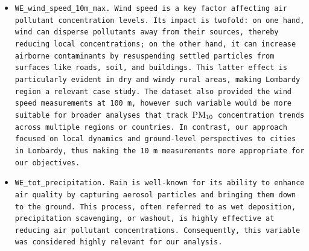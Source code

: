 \documentclass[12pt,	%
	a4paper,		%
	twoside,		%
	openright,		%
	titlepage,%
	]{book}
\theoremstyle{definition}
\begin{document}
\begin{itemize}
    \item \tt{WE\_wind\_speed\_10m\_max}. Wind speed is a key factor affecting air pollutant concentration levels. Its impact is twofold: on one hand, wind can disperse pollutants away from their sources, thereby reducing local concentrations; on the other hand, it can increase airborne contaminants by resuspending settled particles from surfaces like roads, soil, and buildings. This latter effect is particularly evident in dry and windy rural areas, making Lombardy region a relevant case study. The dataset also provided the wind speed measurements at \SI{100}{\metre}, however such variable would be more suitable for broader analyses that track $\text{PM}_{10}$ concentration trends across multiple regions or countries. In contrast, our approach focused on local dynamics and ground-level perspectives to cities in Lombardy, thus making the \SI{10}{\metre} measurements more appropriate for our objectives.

    \item \tt{WE\_tot\_precipitation}. Rain is well-known for its ability to enhance air quality by capturing aerosol particles and bringing them down to the ground. This process, often referred to as wet deposition, precipitation scavenging, or washout, is highly effective at reducing air pollutant concentrations. Consequently, this variable was considered highly relevant for our analysis.


\end{itemize}
\end{document}
